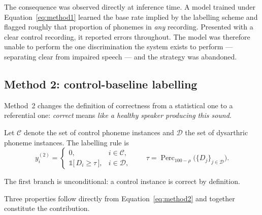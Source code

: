 The consequence was observed directly at inference time. A model trained under
Equation~\eqref{eq:method1} learned the base rate implied by the labelling
scheme and flagged roughly that proportion of phonemes in \emph{any} recording.
Presented with a clear control recording, it reported errors throughout. The
model was therefore unable to perform the one discrimination the system exists
to perform --- separating clear from impaired speech --- and the strategy was
abandoned.

\subsection{Method 2: control-baseline labelling}
\label{sec:method2}

Method~2 changes the definition of correctness from a statistical one to a
referential one: \emph{correct} means \emph{like a healthy speaker producing
this sound}.

Let $\mathcal{C}$ denote the set of control phoneme instances and $\mathcal{D}$
the set of dysarthric phoneme instances. The labelling rule is
\begin{equation}
y_i^{(2)} =
\begin{cases}
0, & i \in \mathcal{C},\\[4pt]
\mathbb{1}\bigl[\,D_i \geq \tau\,\bigr], & i \in \mathcal{D},
\end{cases}
\qquad
\tau = \operatorname{Perc}_{100-\rho}\bigl(\{D_j\}_{j \in \mathcal{D}}\bigr).
\label{eq:method2}
\end{equation}

The first branch is unconditional: a control instance is correct by definition.

Three properties follow directly from Equation~\eqref{eq:method2} and together
constitute the contribution.

